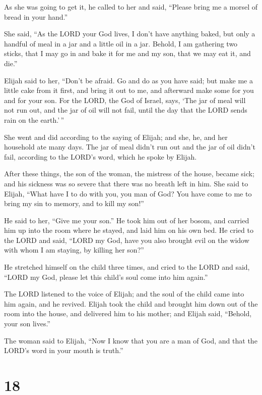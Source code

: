  As she was going to get it, he called to her and said,
``Please bring me a morsel of bread in your hand.''

 She said, ``As the LORD your God lives, I don't have
anything baked, but only a handful of meal in a jar and a little oil in
a jar. Behold, I am gathering two sticks, that I may go in and bake it
for me and my son, that we may eat it, and die.''

 Elijah said to her, ``Don't be afraid. Go and do as you
have said; but make me a little cake from it first, and bring it out to
me, and afterward make some for you and for your son.  For
the LORD, the God of Israel, says, `The jar of meal will not run out,
and the jar of oil will not fail, until the day that the LORD sends rain
on the earth.'\,''

 She went and did according to the saying of Elijah; and
she, he, and her household ate many days.  The jar of meal
didn't run out and the jar of oil didn't fail, according to the LORD's
word, which he spoke by Elijah.

 After these things, the son of the woman, the mistress of
the house, became sick; and his sickness was so severe that there was no
breath left in him.  She said to Elijah, ``What have I to
do with you, you man of God? You have come to me to bring my sin to
memory, and to kill my son!''

 He said to her, ``Give me your son.'' He took him out of
her bosom, and carried him up into the room where he stayed, and laid
him on his own bed.  He cried to the LORD and said, ``LORD
my God, have you also brought evil on the widow with whom I am staying,
by killing her son?''

 He stretched himself on the child three times, and cried
to the LORD and said, ``LORD my God, please let this child's soul come
into him again.''

 The LORD listened to the voice of Elijah; and the soul of
the child came into him again, and he revived.  Elijah took
the child and brought him down out of the room into the house, and
delivered him to his mother; and Elijah said, ``Behold, your son
lives.''

 The woman said to Elijah, ``Now I know that you are a man
of God, and that the LORD's word in your mouth is truth.''

\hypertarget{section-17}{%
\section{18}\label{section-17}}

